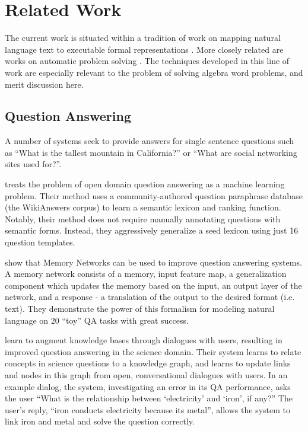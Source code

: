 \section{Related Work}
The current work is situated within a tradition of work on mapping natural language text to executable formal representations \cite{zelle1996learning,Zettlemoyer:UAIC05,GeM:ACL06,kwiatkowski2010inducing}.
More closely related are works on automatic problem solving \cite{mitralearning,seo2014diagram,hixon2015learning}.
The techniques developed in this line of work are especially relevant to the problem of solving algebra word problems, and merit discussion here.

\subsection{Question Answering}
A number of systems seek to provide answers for single sentence questions such as ``What is the tallest mountain in California?'' or ``What are social networking sites used for?''. 

 treats the problem of open domain question answering as a machine learning problem. 
Their method uses a community-authored question paraphrase database (the WikiAnswers corpus) to learn a semantic lexicon and ranking function.
Notably, their method does not require manually annotating questions with semantic forms. 
Instead, they aggressively generalize a seed lexicon using just 16 question templates.

 show that Memory Networks can be used to improve question answering systems. 
A memory network consists of a memory, input feature map, a generalization component which updates the memory based on the input, an output layer of the network, and a response - a translation of the output to the desired format (i.e. text). 
They demonstrate the power of this formalism for modeling natural language on 20 ``toy'' QA tasks with great success.

 learn to augment knowledge bases through dialogues with users, resulting in improved question answering in the science domain. 
Their system learns to relate concepts in science questions to a knowledge graph, and learns to update links and nodes in this graph from open, conversational dialogues with users. 
In an example dialog, the system, investigating an error in its QA performance, asks the user ``What is the relationship between `electricity' and `iron', if any?''
The user's reply, ``iron conducts electricity because its metal'', allows the system to link iron and metal and solve the question correctly.

